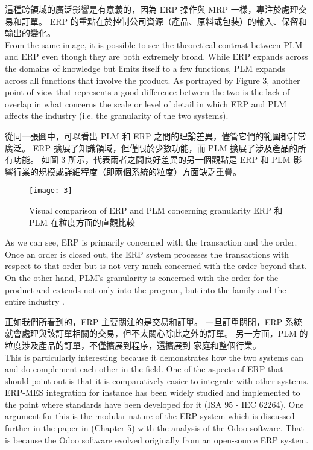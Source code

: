 \fontsize{14pt}{5pt}\sectionef
 {這種跨領域的廣泛影響是有意義的，因為 ERP 操作與 MRP 一樣，專注於處理交易和訂單。 ERP 的重點在於控制公司資源（產品、原料或包裝）的輸入、保留和輸出的變化。}\\[15pt]

\fontsize{14pt}{2.5pt}\sectionef 
{From the same image, it is possible to see the theoretical contrast between PLM and ERP even though they are both extremely broad. While ERP expands across the domains of knowledge but limits itself to a few functions, PLM expands across all functions that involve the product. As portrayed by Figure 3, another point of view that represents a good difference between the two is the lack of overlap in what concerns the scale or level of detail in which ERP and PLM affects the industry (i.e. the granularity of the two systems).}

\fontsize{14pt}{5pt}\sectionef
 {從同一張圖中，可以看出 PLM 和 ERP 之間的理論差異，儘管它們的範圍都非常廣泛。 ERP 擴展了知識領域，但僅限於少數功能，而 PLM 擴展了涉及產品的所有功能。 如圖 3 所示，代表兩者之間良好差異的另一個觀點是 ERP 和 PLM 影響行業的規模或詳細程度（即兩個系統的粒度）方面缺乏重疊。}\\[15pt]
\newpage

\begin{figure}[hbt!]
\begin{center}
\texttt{[image: 3]}
\caption{\large Visual comparison of ERP and PLM concerning granularity ERP 和 PLM 在粒度方面的直觀比較}\label{fig.3}
\end{center}
\end{figure}

\fontsize{14pt}{2.5pt}\sectionef 
{As we can see, ERP is primarily concerned with the transaction and the order. Once an order is closed out, the ERP system processes the transactions with respect to that order but is not very much concerned with the order beyond that. On the other hand, PLM’s granularity is concerned with the order for the product and extends not only into the program, but into 
the family and the entire industry .}

\fontsize{14pt}{5pt}\sectionef
 {正如我們所看到的，ERP 主要關注的是交易和訂單。 一旦訂單關閉，ERP 系統就會處理與該訂單相關的交易，但不太關心除此之外的訂單。 另一方面，PLM 的粒度涉及產品的訂單，不僅擴展到程序，還擴展到
家庭和整個行業。}\\[15pt]
\newpage
\fontsize{14pt}{2.5pt}\sectionef 
{This is particularly interesting because it demonstrates how the two systems can and do complement each other in the field. One of the aspects of ERP that should point out is that it is comparatively easier to integrate with other systems. ERP-MES integration for instance has been widely studied and implemented to the point where standards have been developed for it (ISA 95 - IEC 62264). One argument for this is the modular nature of the ERP system which is discussed further in the paper in (Chapter 5) with the analysis of the Odoo software. That is because the Odoo software evolved originally from an open-source ERP system.}

